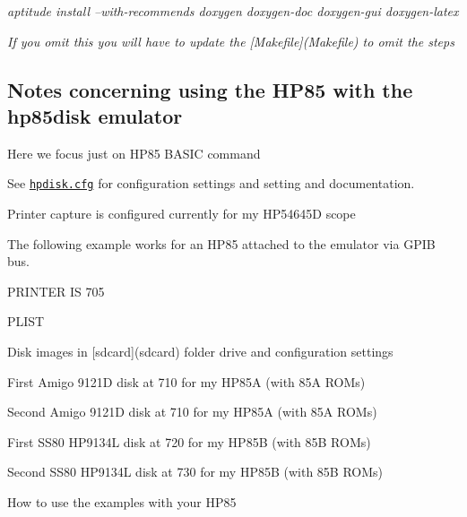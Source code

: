 \begin{DoxyItemize}
\item {\itshape aptitude install --with-\/recommends doxygen doxygen-\/doc doxygen-\/gui doxygen-\/latex}
\item {\itshape If you omit this you will have to update the \mbox{[}Makefile\mbox{]}(Makefile) to omit the steps}
\end{DoxyItemize}





\subsection*{Notes concerning using the H\+P85 with the hp85disk emulator}


\begin{DoxyItemize}
\item Here we focus just on H\+P85 B\+A\+S\+IC command
\item See \href{hpdisk/hpdisk.cfg}{\tt hpdisk.\+cfg} for configuration settings and setting and documentation.
\begin{DoxyItemize}
\item Printer capture is configured currently for my H\+P54645D scope
\begin{DoxyItemize}
\item The following example works for an H\+P85 attached to the emulator via G\+P\+IB bus.
\begin{DoxyItemize}
\item P\+R\+I\+N\+T\+ER IS 705
\item P\+L\+I\+ST
\end{DoxyItemize}
\end{DoxyItemize}
\item Disk images in \mbox{[}sdcard\mbox{]}(sdcard) folder drive and configuration settings
\begin{DoxyItemize}
\item First Amigo 9121D disk at 710 for my H\+P85A (with 85A R\+O\+Ms)
\item Second Amigo 9121D disk at 710 for my H\+P85A (with 85A R\+O\+Ms)
\item First S\+S80 H\+P9134L disk at 720 for my H\+P85B (with 85B R\+O\+Ms)
\item Second S\+S80 H\+P9134L disk at 730 for my H\+P85B (with 85B R\+O\+Ms)
\end{DoxyItemize}
\item How to use the examples with your H\+P85
\begin{DoxyItemize}

\end{DoxyItemize}
\end{DoxyItemize}
\end{DoxyItemize}
